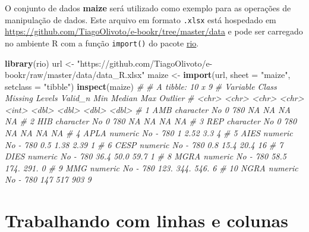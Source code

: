 \documentclass[
]{book}
\newenvironment{Shaded}{\begin{snugshade}}{\end{snugshade}}
\newcommand{\CommentTok}[1]{\textcolor[rgb]{0.56,0.35,0.01}{\textit{#1}}}
\newcommand{\DataTypeTok}[1]{\textcolor[rgb]{0.13,0.29,0.53}{#1}}
\newcommand{\KeywordTok}[1]{\textcolor[rgb]{0.13,0.29,0.53}{\textbf{#1}}}
\newcommand{\NormalTok}[1]{#1}
\newcommand{\StringTok}[1]{\textcolor[rgb]{0.31,0.60,0.02}{#1}}
\numberwithin{equation}{section}
\begin{document}
O conjunto de dados \textbf{maize} será utilizado como exemplo para as operações de manipulação de dados. Este arquivo em formato \texttt{.xlsx} está hospedado em \url{https://github.com/TiagoOlivoto/e-bookr/tree/master/data} e pode ser carregado no ambiente R com a função \texttt{import()} do pacote \href{https://cran.r-project.org/web/packages/rio/index.html}{rio}.

\begin{Shaded}
\begin{Highlighting}[]
\KeywordTok{library}\NormalTok{(rio)}
\NormalTok{url \textless{}{-}}\StringTok{ "https://github.com/TiagoOlivoto/e{-}bookr/raw/master/data/data\_R.xlsx"}
\NormalTok{maize \textless{}{-}}\StringTok{ }\KeywordTok{import}\NormalTok{(url,}
                \DataTypeTok{sheet =} \StringTok{"maize"}\NormalTok{, }
                \DataTypeTok{setclass =} \StringTok{"tibble"}\NormalTok{)}
\KeywordTok{inspect}\NormalTok{(maize)}
\CommentTok{\# \# A tibble: 10 x 9}
\CommentTok{\#    Variable Class     Missing Levels Valid\_n   Min Median    Max Outlier}
\CommentTok{\#    \textless{}chr\textgreater{}    \textless{}chr\textgreater{}     \textless{}chr\textgreater{}   \textless{}chr\textgreater{}    \textless{}int\textgreater{} \textless{}dbl\textgreater{}  \textless{}dbl\textgreater{}  \textless{}dbl\textgreater{}   \textless{}dbl\textgreater{}}
\CommentTok{\#  1 AMB      character No      0          780  NA    NA     NA         NA}
\CommentTok{\#  2 HIB      character No      0          780  NA    NA     NA         NA}
\CommentTok{\#  3 REP      character No      0          780  NA    NA     NA         NA}
\CommentTok{\#  4 APLA     numeric   No      {-}          780   1     2.52   3.3        4}
\CommentTok{\#  5 AIES     numeric   No      {-}          780   0.5   1.38   2.39       1}
\CommentTok{\#  6 CESP     numeric   No      {-}          780   0.8  15.4   20.4       16}
\CommentTok{\#  7 DIES     numeric   No      {-}          780  36.4  50.0   59.7        1}
\CommentTok{\#  8 MGRA     numeric   No      {-}          780  58.5 174.   291.         0}
\CommentTok{\#  9 MMG      numeric   No      {-}          780 123.  344.   546.         6}
\CommentTok{\# 10 NGRA     numeric   No      {-}          780 147   517    903          9}
\end{Highlighting}
\end{Shaded}

\hypertarget{trabalhando-com-linhas-e-colunas}{%
\section{Trabalhando com linhas e colunas}\label{trabalhando-com-linhas-e-colunas}}
\end{document}
